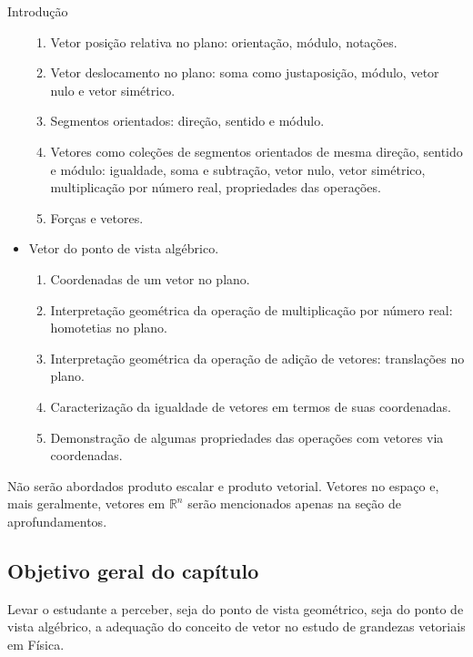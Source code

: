 \begin{apresentacao}{Introdução}
\begin{itemize}
\begin{enumerate}
\item {} 
Vetor posição relativa no plano: orientação, módulo, notações.

\item {} 
Vetor deslocamento no plano: soma como justaposição, módulo, vetor nulo e vetor simétrico.

\item {} 
Segmentos orientados: direção, sentido e módulo.

\item {} 
Vetores como coleções de segmentos orientados de mesma direção, sentido e módulo: igualdade, soma e subtração, vetor nulo, vetor simétrico, multiplicação por número real, propriedades das operações.
\item {} 
Forças e vetores.

\end{enumerate}

\clearpage
\item {} 
Vetor do ponto de vista algébrico.
\begin{enumerate}
\item {} 
Coordenadas de um vetor no plano.

\item {} 
Interpretação geométrica da operação de multiplicação por número real: homotetias no plano.

\item {} 
Interpretação geométrica da operação de adição de vetores: translações no plano.

\item {} 
Caracterização da igualdade de vetores em termos de suas coordenadas.

\item {} 
Demonstração de algumas propriedades das operações com vetores via coordenadas.

\end{enumerate}

\end{itemize}

Não serão abordados produto escalar e produto vetorial. Vetores no espaço e, mais geralmente, vetores em \({\mathbb R}^{n}\) serão mencionados apenas na seção de aprofundamentos.

\subsection{Objetivo geral do capítulo}

Levar o estudante a perceber, seja do ponto de vista geométrico, seja do ponto de vista algébrico, a adequação do conceito de vetor no estudo de grandezas vetoriais em Física.


\end{apresentacao}
